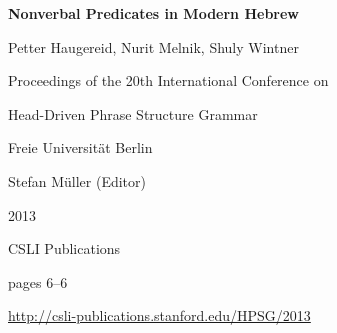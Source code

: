 \documentclass[a4paper,11pt]{article}
\begin{document}
\begin{center}
  {\huge\bf Nonverbal Predicates in Modern Hebrew\par}

  \bigskip

  {\LARGE Petter Haugereid, Nurit Melnik, Shuly Wintner\par}

  \vspace*{3\bigskipamount}

  Proceedings of the 20th International Conference on\par Head-Driven Phrase Structure Grammar

  \bigskip

  Freie Universität Berlin

  \medskip

  Stefan Müller (Editor)

  \medskip

  2013

  \medskip

  CSLI Publications

  \medskip

  pages 6--6

  \medskip

  \url{http://csli-publications.stanford.edu/HPSG/2013}
\end{center}

\newpage

        
\end{document}

